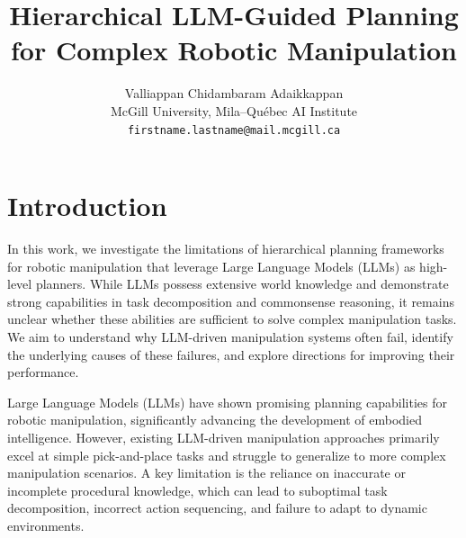 \documentclass{article} %
\title{Hierarchical LLM-Guided Planning for Complex Robotic Manipulation}
\author{Valliappan Chidambaram Adaikkappan\\
McGill University, Mila--Qu\'{e}bec AI Institute\\
\texttt{firstname.lastname@mail.mcgill.ca} \\
}
\begin{document}
\maketitle

\begin{abstract}
\end{abstract}

\section{Introduction}
In this work, we investigate the limitations of hierarchical planning frameworks for robotic manipulation that leverage Large Language Models (LLMs) as high-level planners. While LLMs possess extensive world knowledge and demonstrate strong capabilities in task decomposition and commonsense reasoning, it remains unclear whether these abilities are sufficient to solve complex manipulation tasks. We aim to understand why LLM-driven manipulation systems often fail, identify the underlying causes of these failures, and explore directions for improving their performance.

Large Language Models (LLMs) have shown promising planning capabilities for robotic manipulation, significantly advancing the development of embodied intelligence. However, existing LLM-driven manipulation approaches primarily excel at simple pick-and-place tasks and struggle to generalize to more complex manipulation scenarios. A key limitation is the reliance on inaccurate or incomplete procedural knowledge, which can lead to suboptimal task decomposition, incorrect action sequencing, and failure to adapt to dynamic environments.
\end{document}

